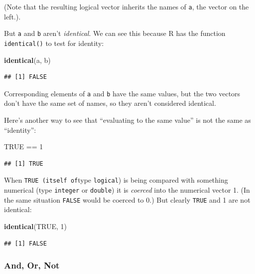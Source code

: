\documentclass[]{book}
\makeatletter
\newenvironment{Shaded}{\begin{snugshade}}{\end{snugshade}}
\newcommand{\KeywordTok}[1]{\textcolor[rgb]{0.13,0.29,0.53}{\textbf{{#1}}}}
\newcommand{\DecValTok}[1]{\textcolor[rgb]{0.00,0.00,0.81}{{#1}}}
\newcommand{\StringTok}[1]{\textcolor[rgb]{0.31,0.60,0.02}{{#1}}}
\newcommand{\OtherTok}[1]{\textcolor[rgb]{0.56,0.35,0.01}{{#1}}}
\newcommand{\NormalTok}[1]{{#1}}
\newenvironment{kframe}{%
\medskip{}
\setlength{\fboxsep}{.8em}
 \def\at@end@of@kframe{}%
 \ifinner\ifhmode%
  \def\at@end@of@kframe{\end{minipage}}%
  \begin{minipage}{\columnwidth}%
 \fi\fi%
 \def\FrameCommand##1{\hskip\@totalleftmargin \hskip-\fboxsep
 \colorbox{shadecolor}{##1}\hskip-\fboxsep
     \hskip-\linewidth \hskip-\@totalleftmargin \hskip\columnwidth}%
 \MakeFramed {\advance\hsize-\width
   \@totalleftmargin\z@ \linewidth\hsize
   \@setminipage}}%
 {\par\unskip\endMakeFramed%
 \at@end@of@kframe}
\renewenvironment{Shaded}{\begin{kframe}}{\end{kframe}}
\theoremstyle{definition}
\theoremstyle{definition}
\theoremstyle{remark}
\makeatother
\begin{document}
(Note that the resulting logical vector inherits the names of
\texttt{a}, the vector on the left.).

But \texttt{a} and \texttt{b} aren't \emph{identical}. We can see this
because R has the function \texttt{identical()} to test for identity:

\begin{Shaded}
\begin{Highlighting}[]
\KeywordTok{identical}\NormalTok{(a, b)}
\end{Highlighting}
\end{Shaded}

\begin{verbatim}
## [1] FALSE
\end{verbatim}

Corresponding elements of \texttt{a} and \texttt{b} have the same
values, but the two vectors don't have the same set of names, so they
aren't considered identical.

Here's another way to see that ``evaluating to the same value'' is not
the same as ``identity'':

\begin{Shaded}
\begin{Highlighting}[]
\OtherTok{TRUE} \NormalTok{==}\StringTok{ }\DecValTok{1}
\end{Highlighting}
\end{Shaded}

\begin{verbatim}
## [1] TRUE
\end{verbatim}

When \texttt{TRUE\ (itself\ of}type \texttt{logical}) is being compared
with something numerical (type \texttt{integer} or \texttt{double}) it
is \emph{coerced} into the numerical vector 1. (In the same situation
\texttt{FALSE} would be coerced to 0.) But clearly \texttt{TRUE} and 1
are not identical:

\begin{Shaded}
\begin{Highlighting}[]
\KeywordTok{identical}\NormalTok{(}\OtherTok{TRUE}\NormalTok{, }\DecValTok{1}\NormalTok{)}
\end{Highlighting}
\end{Shaded}

\begin{verbatim}
## [1] FALSE
\end{verbatim}

\subsubsection{And, Or, Not}\label{and-or-not}
\end{document}
